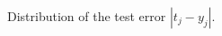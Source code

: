 \documentclass[10pt,a4paper,notitlepage,twocolumn]{article}
\begin{document}
\begin{figure}[!h]
\caption{Distribution of the test error $|t_j-y_j|$.}
\end{figure}
\end{document}
